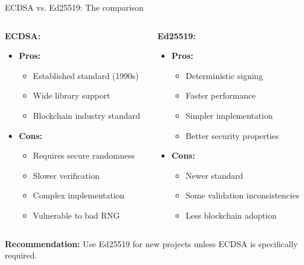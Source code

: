\documentclass[aspectratio=169, lualatex, handout]{beamer}
\begin{document}
\begin{frame}{ECDSA vs. Ed25519: The comparison}
	\begin{columns}
		\begin{column}{0.5\textwidth}
			\textbf{ECDSA:}
			\begin{itemize}
				\item \textbf{Pros:}
				      \begin{itemize}
					      \item Established standard (1990s)
					      \item Wide library support
					      \item Blockchain industry standard
				      \end{itemize}
				\item \textbf{Cons:}
				      \begin{itemize}
					      \item Requires secure randomness
					      \item Slower verification
					      \item Complex implementation
					      \item Vulnerable to bad RNG
				      \end{itemize}
			\end{itemize}
		\end{column}
		\begin{column}{0.5\textwidth}
			\textbf{Ed25519:}
			\begin{itemize}
				\item \textbf{Pros:}
				      \begin{itemize}
					      \item Deterministic signing
					      \item Faster performance
					      \item Simpler implementation
					      \item Better security properties
				      \end{itemize}
				\item \textbf{Cons:}
				      \begin{itemize}
					      \item Newer standard
					      \item Some validation inconsistencies
					      \item Less blockchain adoption
				      \end{itemize}
			\end{itemize}
		\end{column}
	\end{columns}
	\vspace{0.5cm}
	\textbf{Recommendation:} Use Ed25519 for new projects unless ECDSA is specifically required.
\end{frame}
\end{document}
